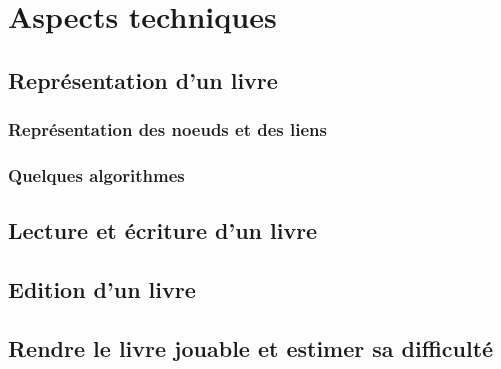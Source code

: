\chapter{Aspects techniques}

	\section{Représentation d'un livre}

		\subsection{Représentation des noeuds et des liens}



		\subsection{Quelques algorithmes}



	\section{Lecture et écriture d'un livre}


	\section{Edition d'un livre}



	\section{Rendre le livre jouable et estimer sa difficulté}
